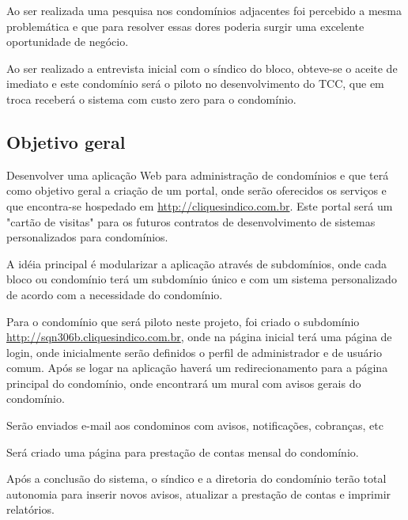 Ao ser realizada uma pesquisa nos condomínios adjacentes foi percebido a mesma
problemática e que para resolver essas dores poderia surgir uma excelente
oportunidade de negócio.

Ao ser realizado a entrevista inicial com o síndico do bloco, obteve-se o
aceite de imediato e este condomínio será o piloto no desenvolvimento
do TCC, que em troca receberá o sistema com custo zero para o condomínio.

\subsection{Objetivo geral}
Desenvolver uma aplicação Web para administração de condomínios e que
terá como objetivo geral a criação de um portal, onde serão oferecidos
os serviços e que encontra-se hospedado em \url{http://cliquesindico.com.br}.
Este portal será um "cartão de visitas" para os futuros contratos de
desenvolvimento de sistemas personalizados para condomínios.

A idéia principal é modularizar a aplicação através de subdomínios, onde cada 
bloco ou condomínio terá um subdomínio único e com um sistema personalizado
de acordo com a necessidade do condomínio.

Para o condomínio que será piloto neste projeto, foi criado o subdomínio
\url{http://sqn306b.cliquesindico.com.br}, onde na página inicial terá uma página
de login, onde inicialmente serão definidos o perfil de administrador e de usuário
comum. Após se logar na aplicação haverá um redirecionamento para a página
principal do condomínio, onde encontrará um mural com avisos gerais do condomínio.

Serão enviados e-mail aos condominos com avisos, notificações, cobranças, etc

Será criado uma página para prestação de contas mensal do condomínio.

Após a conclusão do sistema, o síndico e a diretoria do condomínio terão total
autonomia para inserir novos avisos, atualizar a prestação de contas e imprimir
relatórios.

